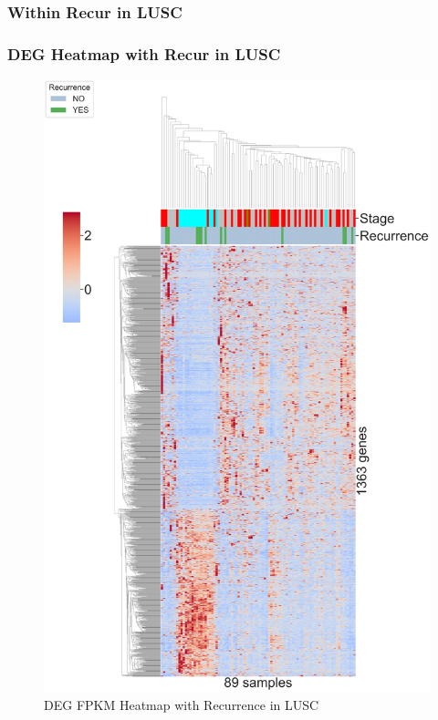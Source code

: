 \documentclass{beamer}
\begin{document}
    \subsubsection{Within Recur in LUSC}
    \begin{frame}
        \frametitle{DEG Heatmap with Recur in LUSC}

        \begin{figure}
            \includegraphics[width=0.35 \linewidth]{figures/DEG/Cluster/STAR.FPKM.SQC.Recur.pdf}
            \caption{DEG FPKM Heatmap with Recurrence in LUSC}
        \end{figure}
    \end{frame}
\end{document}
